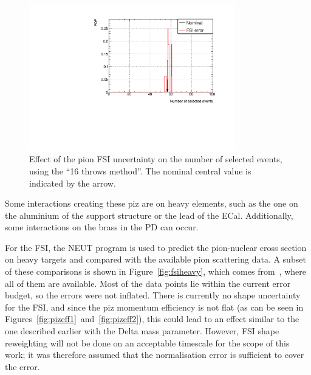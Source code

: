 \begin{figure}[ht]
  \center
  \includegraphics[width=0.8\textwidth]{images/NCg/FSI.pdf} 
  \caption[Effect of the pion FSI uncertainty on the number of
  selected events]{Effect of the pion \Gls{FSI} uncertainty on the
    number of selected events, using the ``16 throws method''. The
    nominal central value is indicated by the arrow.}
  \label{fig:fsierror}
\end{figure}

Some interactions creating these \Gls{piz} are on heavy elements, such
as the one on the aluminium of the support structure or the lead of
the \Gls{ECal}. Additionally, some interactions on the brass in the
\Gls{PD} can occur.

For the \Gls{FSI}, the \Gls{NEUT} program is used to predict the
pion-nuclear cross section on heavy targets and compared with the
available pion scattering data. A subset of these comparisons is shown
in Figure~\ref{fig:fsiheavy}, which comes from~\cite{FSITalk}, where
all of them are available. Most of the data points lie within the
current error budget, so the errors were not inflated. There is
currently no shape uncertainty for the \Gls{FSI}, and since the
\gls{piz} momentum efficiency is not flat (as can be seen in
Figures~\ref{fig:pizeff1}~and~\ref{fig:pizeff2}), this could lead to
an effect similar to the one described earlier with the Delta mass
parameter. However, \Gls{FSI} shape reweighting will not be done on an
acceptable timescale for the scope of this work; it was therefore
assumed that the normalisation error is sufficient to cover the error.



